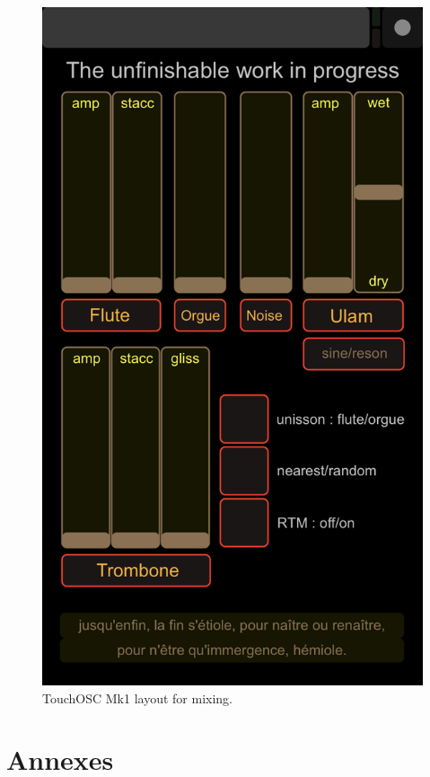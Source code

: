 \documentclass{article}
\begin{document}
\begin{figure}[H]
\centering
\includegraphics[width=\textwidth/2]{../img/9930}
\caption{TouchOSC Mk1 layout for mixing.}
\label{iphonemix}
\end{figure}

\newpage

\section*{Annexes}
\label{annexes}
\end{document}

